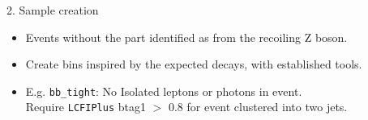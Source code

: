 \begin{block}{2. Sample creation}
    \begin{itemize}
    \item Events without the part identified as from the recoiling Z boson.
    \item Create bins inspired by the expected decays, with established tools.
    \item E.g. \texttt{bb\_tight}:
        No Isolated leptons or photons in event.\\
        Require \texttt{LCFIPlus} btag1 $>$ 0.8 for event clustered into two jets.
    \end{itemize}
\end{block}
